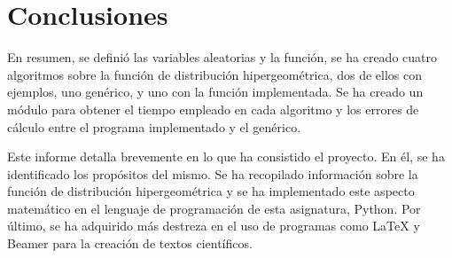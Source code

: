 \documentclass[spanish,a4paper,12pt]{report}
\begin{document}
\chapter{Conclusiones}

En resumen, se definió las variables aleatorias y la función, se ha creado cuatro algoritmos sobre la función de distribución hipergeométrica, dos de ellos con ejemplos, uno genérico, y uno con la función implementada. Se ha creado un módulo para obtener el tiempo empleado en cada algoritmo y los errores de cálculo entre el programa implementado y el genérico.

Este informe detalla brevemente en lo que ha consistido el proyecto. En él, se ha identificado los propósitos del mismo.
Se ha recopilado información sobre la función de distribución hipergeométrica y se ha implementado este aspecto matemático en el lenguaje de programación de esta asignatura, Python.
Por último, se ha adquirido más destreza en el uso de programas como \LaTeX{} y Beamer para la creación de textos científicos.
\end{document}
